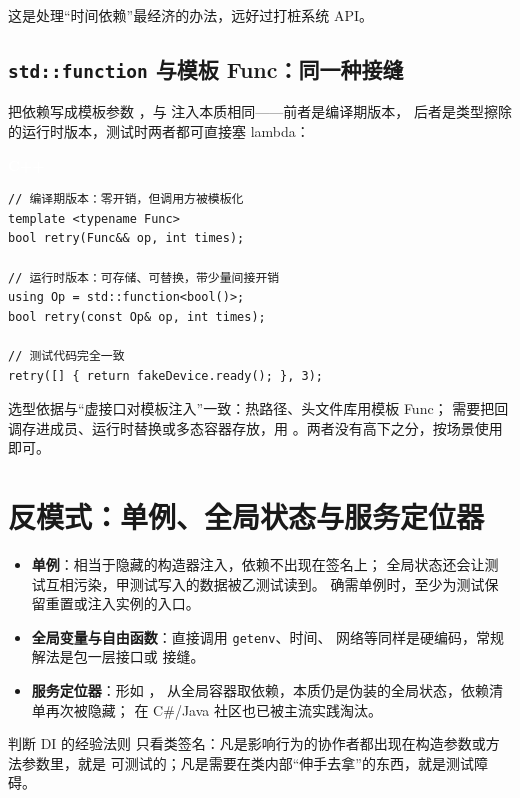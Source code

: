 \documentclass[12pt,a4paper,fontset=fandol]{ctexbook}
\newcommand{\cpplabel}{%
  \begin{tcolorbox}[enhanced,colback=cppheadbg,colframe=cppheadbg,
    arc=1mm,boxrule=0mm,left=6pt,right=6pt,top=2pt,bottom=2pt,
    halign=left,oversize]
    \textcolor{white}{\small\bfseries C++}
  \end{tcolorbox}\vspace{-4pt}}
\begin{document}
这是处理“时间依赖”最经济的办法，远好过打桩系统 API。

\subsection{\texttt{std::function} 与模板 Func：同一种接缝}

把依赖写成模板参数 ，与
 注入本质相同——前者是编译期版本，
后者是类型擦除的运行时版本，测试时两者都可直接塞 lambda：

\cpplabel
\begin{lstlisting}
// 编译期版本：零开销，但调用方被模板化
template <typename Func>
bool retry(Func&& op, int times);

// 运行时版本：可存储、可替换，带少量间接开销
using Op = std::function<bool()>;
bool retry(const Op& op, int times);

// 测试代码完全一致
retry([] { return fakeDevice.ready(); }, 3);
\end{lstlisting}

选型依据与“虚接口对模板注入”一致：热路径、头文件库用模板 Func；
需要把回调存进成员、运行时替换或多态容器存放，用
。两者没有高下之分，按场景使用即可。

\section{反模式：单例、全局状态与服务定位器}

\begin{itemize}
  \item \textbf{单例}：相当于隐藏的构造器注入，依赖不出现在签名上；
        全局状态还会让测试互相污染，甲测试写入的数据被乙测试读到。
        确需单例时，至少为测试保留重置或注入实例的入口。
  \item \textbf{全局变量与自由函数}：直接调用 \texttt{getenv}、时间、
        网络等同样是硬编码，常规解法是包一层接口或
         接缝。
  \item \textbf{服务定位器}：形如 ，
        从全局容器取依赖，本质仍是伪装的全局状态，依赖清单再次被隐藏；
        在 C\#/Java 社区也已被主流实践淘汰。
\end{itemize}

\begin{guideline}{判断 DI 的经验法则}
只看类签名：凡是影响行为的协作者都出现在构造参数或方法参数里，就是
可测试的；凡是需要在类内部“伸手去拿”的东西，就是测试障碍。
\end{guideline}
\end{document}
